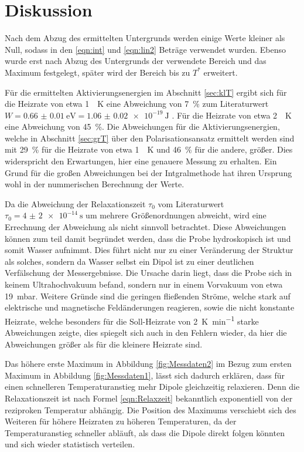 \section{Diskussion}
\label{sec:Diskussion}
Nach dem Abzug des ermittelten Untergrunds werden einige Werte kleiner als Null, sodass in den \eqref{eqn:int} und \eqref{eqn:lin2} Beträge
verwendet wurden. Ebenso wurde erst nach Abzug des Untergrunds der verwendete Bereich und das Maximum festgelegt, später wird der Bereich bis zu
$T^*$ erweitert.

Für die ermittelten Aktivierungsenergien im Abschnitt \ref{sec:klT} ergibt sich für die Heizrate von etwa \SI{1}{\per\kelvin} eine 
Abweichung von \SI{7}{\percent} zum Literaturwert $W=\SI{0.66(1)}{\electronvolt} = \SI{1.06(2)e-19}{\joule}$ \cite{quelle}.
Für die Heizrate von  etwa \SI{2}{\per\kelvin} eine Abweichung von \SI{45}{\percent}. 
Die Abweichungen für die Aktivierungsenergien, welche in Abschnitt \ref{sec:grT} über den Polarisationsansatz ermittelt werden sind mit
\SI{29}{\percent} für die Heizrate von etwa \SI{1}{\per\kelvin} und \SI{46}{\percent} für die andere, größer. Dies 
widerspricht den Erwartungen, hier eine genauere Messung zu erhalten. Ein Grund für die großen Abweichungen
bei der Intgralmethode hat ihren Ursprung wohl in der nummerischen Berechnung der Werte.

Da die Abweichung der Relaxationszeit $\tau_0$ vom Literaturwert $\tau_0 = \SI{4(2)e-14}{\second}$ um mehrere Größenordnungen
abweicht, wird eine Errechnung der Abweichung als nicht sinnvoll betrachtet.
Diese Abweichungen können zum teil damit begründet werden, dass die Probe hydroskopisch ist 
und somit Wasser aufnimmt. Dies führt nicht nur zu einer Veränderung der Struktur als solches, sondern da Wasser selbst ein 
Dipol ist zu einer deutlichen Verfälschung der Messergebnisse. Die Ursache darin liegt, dass die Probe sich in keinem 
Ultrahochvakuum befand, sondern nur in einem Vorvakuum von etwa \SI{19}{\milli\bar}. 
Weitere Gründe sind die geringen fließenden Ströme, welche stark auf elektrische und magnetische Feldänderungen reagieren, sowie
die nicht konstante Heizrate, welche besonders für die Soll-Heizrate von \SI{2}{\kelvin\per\minute} starke Abweichungen zeigte, dies 
spiegelt sich auch in den Fehlern wieder, da hier die Abweichungen größer als für die kleinere Heizrate sind.


Das höhere erste Maximum in Abbildung \ref{fig:Messdaten2} im Bezug zum ersten Maximum in Abbildung \ref{fig:Messdaten1}, lässt
sich dadurch erklären, dass für einen schnelleren Temperaturanstieg mehr Dipole gleichzeitig relaxieren. Denn die Relaxationszeit
ist nach Formel \eqref{eqn:Relaxzeit} bekanntlich exponentiell von der reziproken Temperatur abhängig.
Die Position des Maximums verschiebt sich des Weiteren für höhere Heizraten zu höheren Temperaturen, da der Temperaturanstieg
schneller abläuft, als dass die Dipole direkt folgen könnten und sich wieder statistisch verteilen.

